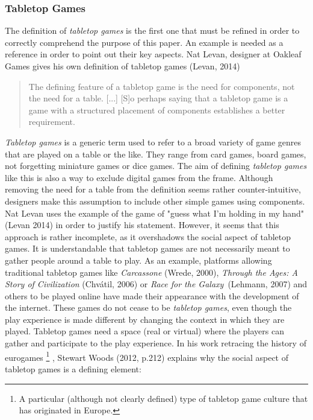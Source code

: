 \subsubsection{Tabletop Games}
The definition of \textit{tabletop games} is the first one that must be refined in order to correctly comprehend the purpose of this paper. An example is needed as a reference in order to point out their key aspects. Nat Levan, designer at Oakleaf Games gives his own definition of tabletop games (Levan, 2014)\cite{web:oak}
\begin{quotation}
The defining feature of a tabletop game is the need for components, not the need for a table. [...] [S]o perhaps saying that a tabletop game is a game with a structured placement of components establishes a better requirement.
\end{quotation} 
\textit{Tabletop games} is a generic term used to refer to a broad variety of game genres that are played on a table or the like. They range from card games, board games, not forgetting miniature games or dice games. The aim of defining \textit{tabletop games} like this is also a way to exclude digital games from the frame. 
Although removing the need for a table from the definition seems rather counter-intuitive, designers make this assumption to include other simple games using components. Nat Levan uses the example of the game of "guess what I'm holding in my hand"(Levan 2014) in order to justify his statement. 
However, it seems that this approach is rather incomplete, as it overshadows the social aspect of tabletop games. It is understandable that tabletop games are not necessarily meant to gather people around a table to play. As an example, platforms allowing traditional tabletop games like \textit{Carcassone} (Wrede, 2000)\cite{game:carca}, \textit{Through the Ages: A Story of Civilization} (Chvátil, 2006)\cite{game:ages} or \textit{Race for the Galaxy}\ (Lehmann, 2007)\cite{game:race} and others to be played online have made their appearance with the development of the internet. 
These games do not cease to be \textit{tabletop games}, even though the play experience is made different by changing the context in which they are played. Tabletop games need a space (real or virtual) where the players can gather and participate to the play experience. In his work retracing the history of eurogames
\footnote{A particular (although not clearly defined) type of tabletop game culture that has originated in Europe.}
, Stewart Woods (2012, p.212)\cite{book:euro} explains why the social aspect of tabletop games is a defining element:
